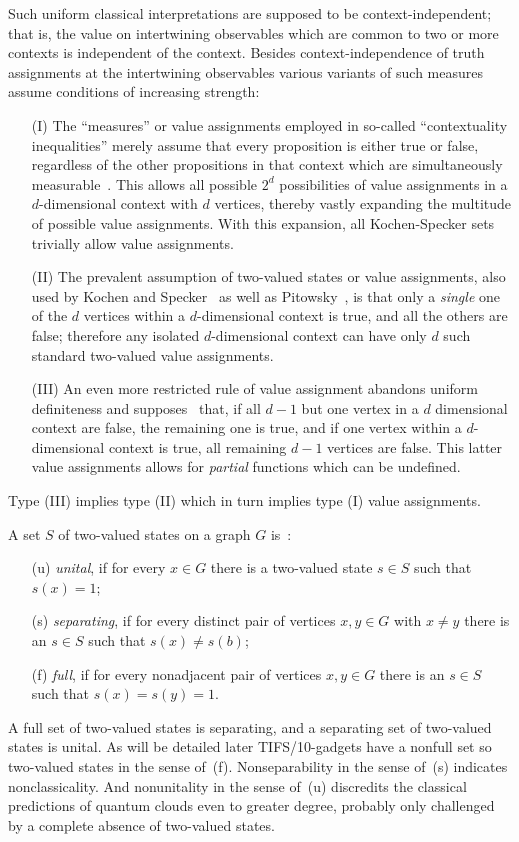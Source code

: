 \documentclass[%
  reprint,
  twocolumn,
 showpacs,
 showkeys,
 preprintnumbers,
 amsmath,amssymb,
 aps,
  prl,
  longbibliography,
 ]{revtex4-1}
\begin{document}
Such uniform classical interpretations are supposed to be context-independent;
that is, the value on intertwining observables which are common to two or more contexts is independent
of the context.
Besides context-independence of truth assignments at the intertwining observables various variants of such measures assume conditions of increasing strength:
\begin{itemize}
\item[(I)] The ``measures'' or value assignments employed in so-called ``contextuality inequalities''
merely assume that every proposition is either true or false,
regardless of the other propositions in that context which are simultaneously measurable~\cite{cabello:210401}.
This allows all possible $2^d$ possibilities of value assignments in a $d$-dimensional context with $d$ vertices,
thereby vastly expanding the multitude of possible value assignments.
With this expansion, all Kochen-Specker sets trivially allow value assignments.
\item[(II)] The prevalent assumption of two-valued states or value assignments, also used by Kochen and Specker~\cite{kochen1} as well as Pitowsky~\cite{pitowsky:218},
is that only a {\em single} one of the $d$ vertices within a $d$-dimensional context
is true, and all the others are false; therefore any isolated $d$-dimensional context can have only $d$ such standard two-valued value assignments.
\item[(III)] An even more restricted rule of value assignment abandons uniform definiteness
and supposes~\cite{2012-incomput-proofsCJ,PhysRevA.89.032109,2015-AnalyticKS} that,
if all $d-1$ but one vertex  in a $d$ dimensional context are false, the remaining one is true,
and if one vertex within a $d$-dimensional context is true, all remaining  $d-1$ vertices are false.
This latter value assignments allows for {\em partial} functions which can be undefined.
\end{itemize}
Type (III) implies
type (II) which in turn implies type (I) value assignments.

A set $S$ of two-valued states on a graph $G$ is~\cite{tkadlec-96}:
\begin{itemize}
\item[(u)] {\em unital}, if for every $x\in G$ there is a two-valued state $s\in S$
such that $s(x) = 1$;
\item[(s)] {\em separating}, if for every distinct pair of vertices $x,y\in G$
with $x\neq y$ there is an $s\in S$ such that $s (x) \neq s (b)$;
\item[(f)] {\em full}, if for every nonadjacent pair of vertices $x,y\in G$
there is an $s \in S$ such that $s (x) = s (y) = 1$.
\end{itemize}
A full set of
two-valued states is separating,
and a separating set of
two-valued states is unital.
As will be detailed later TIFS/10-gadgets have a nonfull set so two-valued states in the sense of~(f).
Nonseparability in the sense of~(s) indicates nonclassicality.
And nonunitality in the sense of~(u) discredits the classical predictions of quantum clouds
even to greater degree, probably only challenged by a complete absence of two-valued states.
\end{document}
